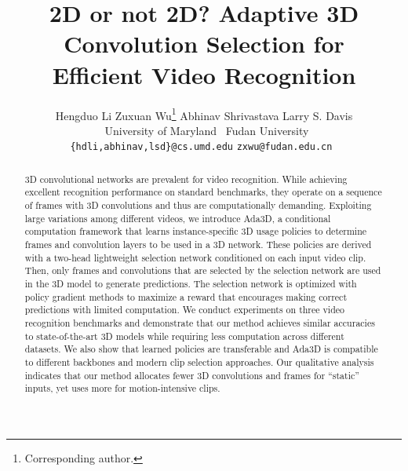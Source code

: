 \documentclass[final]{cvpr}
\begin{document}
\title{2D or not 2D? Adaptive 3D Convolution Selection for \\ Efficient Video Recognition}

\author{Hengduo Li \qquad Zuxuan Wu\thanks{Corresponding author.} \qquad Abhinav Shrivastava \qquad Larry S. Davis \\
~University of Maryland \qquad ~Fudan University \\
{\tt\small \{hdli,abhinav,lsd\}@cs.umd.edu} \quad \tt\small zxwu@fudan.edu.cn
}

\maketitle

\thispagestyle{empty}
\pagestyle{empty}

\begin{abstract}
3D convolutional networks are prevalent for video recognition. While achieving excellent recognition performance on standard benchmarks, they operate on a sequence of frames with 3D convolutions and thus are computationally demanding. 
Exploiting large variations among different videos, we introduce Ada3D, a conditional computation framework that learns  instance-specific 3D usage policies to determine frames and convolution layers to be used in a 3D network. These policies are derived with a two-head lightweight selection network conditioned on each input video clip. Then, only frames and convolutions that are selected by the selection network are used in the 3D model to generate predictions. The selection network is optimized with policy gradient methods to maximize a reward that encourages making correct predictions with limited computation. 
We conduct experiments on three video recognition benchmarks and demonstrate that our method achieves similar accuracies to state-of-the-art 3D models while requiring  less computation across different datasets. We also show that learned policies are transferable and Ada3D is compatible to different backbones and modern clip selection approaches. Our qualitative analysis indicates that our method allocates fewer 3D convolutions and frames for ``static'' inputs, yet uses more for motion-intensive clips. 
\end{abstract}
\end{document}
